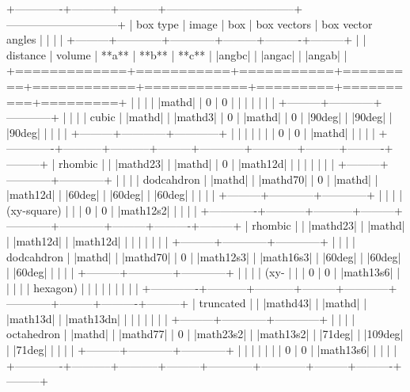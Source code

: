    +-------------+-----------+-----------+-----------------------------------+------------------------------+
    | box type    | image     | box       | box vectors                       | box vector angles            | 
    |             |           |           +---------+------------+------------+---------+----------+---------+
    |             | distance  | volume    | **a**   | **b**      | **c**      | |angbc| | |angac|  | |angab| |
    +=============+===========+===========+=========+============+============+=========+==========+=========+
    |             |           |           | |mathd| |   0        |   0        |         |          |         |
    |             |           |           +---------+------------+------------+         |          |         |
    | cubic       | |mathd|   | |mathd3|  |   0     | |mathd|    |   0        | |90deg| | |90deg|  | |90deg| |
    |             |           |           +---------+------------+------------+         |          |         |
    |             |           |           |   0     |   0        | |mathd|    |         |          |         |
    +-------------+-----------+-----------+---------+------------+------------+---------+----------+---------+
    | rhombic     |           | |mathd23| | |mathd| | 0          | |math12d|  |         |          |         |
    |             |           |           +---------+------------+------------+         |          |         |
    | dodcahdron  | |mathd|   | |mathd70| | 0       | |mathd|    | |math12d|  | |60deg| | |60deg|  | |60deg| |
    |             |           |           +---------+------------+------------+         |          |         |
    | (xy-square) |           |           | 0       | 0          | |math12s2| |         |          |         |
    +-------------+-----------+-----------+---------+------------+------------+---------+----------+---------+
    | rhombic     |           | |mathd23| | |mathd| | |math12d|  | |math12d|  |         |          |         |
    |             |           |           +---------+------------+------------+         |          |         |
    | dodcahdron  | |mathd|   | |mathd70| | 0       | |math12s3| | |math16s3| | |60deg| | |60deg|  | |60deg| |
    |             |           |           +---------+------------+------------+         |          |         |
    | (xy-        |           |           | 0       | 0          | |math13s6| |         |          |         |
    | hexagon)    |           |           |         |            |            |         |          |         |
    +-------------+-----------+-----------+---------+------------+------------+---------+----------+---------+
    | truncated   |           | |mathd43| | |mathd| | |math13d|  | |math13dn| |         |          |         |
    |             |           |           +---------+------------+------------+         |          |         |
    | octahedron  | |mathd|   | |mathd77| | 0       | |math23s2| | |math13s2| | |71deg| | |109deg| | |71deg| |
    |             |           |           +---------+------------+------------+         |          |         |
    |             |           |           | 0       | 0          | |math13s6| |         |          |         |
    +-------------+-----------+-----------+---------+------------+------------+---------+----------+---------+

